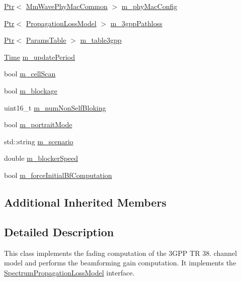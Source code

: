 \begin{DoxyCompactItemize}
\item 
\hyperlink{classns3_1_1Ptr}{Ptr}$<$ \hyperlink{classns3_1_1MmWavePhyMacCommon}{Mm\+Wave\+Phy\+Mac\+Common} $>$ \hyperlink{classns3_1_1MmWave3gppChannel_a50988766af948ea236ce24718a6dca7d}{m\+\_\+phy\+Mac\+Config}
\item 
\hyperlink{classns3_1_1Ptr}{Ptr}$<$ \hyperlink{classns3_1_1PropagationLossModel}{Propagation\+Loss\+Model} $>$ \hyperlink{classns3_1_1MmWave3gppChannel_add8860051acacb1819be2f7321dbd726}{m\+\_\+3gpp\+Pathloss}
\item 
\hyperlink{classns3_1_1Ptr}{Ptr}$<$ \hyperlink{structns3_1_1ParamsTable}{Params\+Table} $>$ \hyperlink{classns3_1_1MmWave3gppChannel_a463c1cc6d34730bbdebdd593f374914b}{m\+\_\+table3gpp}
\item 
\hyperlink{classns3_1_1Time}{Time} \hyperlink{classns3_1_1MmWave3gppChannel_a2844f8c7e7373cb777384eaf0e8a7b11}{m\+\_\+update\+Period}
\item 
bool \hyperlink{classns3_1_1MmWave3gppChannel_ac973f52321b6843ce42f036620af63e8}{m\+\_\+cell\+Scan}
\item 
bool \hyperlink{classns3_1_1MmWave3gppChannel_a5f19d0ed379e7db9448f4f668e0c7927}{m\+\_\+blockage}
\item 
uint16\+\_\+t \hyperlink{classns3_1_1MmWave3gppChannel_addfe5e6c9d8e2531fe165ff86461d2d3}{m\+\_\+num\+Non\+Self\+Bloking}
\item 
bool \hyperlink{classns3_1_1MmWave3gppChannel_a013ed012d87114993312ccfd172fe377}{m\+\_\+portrait\+Mode}
\item 
std\+::string \hyperlink{classns3_1_1MmWave3gppChannel_ae1f263fbc87682905d563221343e4447}{m\+\_\+scenario}
\item 
double \hyperlink{classns3_1_1MmWave3gppChannel_a5d7b7b759283cdf9a6781571e9eeca25}{m\+\_\+blocker\+Speed}
\item 
bool \hyperlink{classns3_1_1MmWave3gppChannel_a2d5a32e24f0d795c5ed210f8c38f4e9b}{m\+\_\+force\+Initial\+Bf\+Computation}
\end{DoxyCompactItemize}
\subsection*{Additional Inherited Members}


\subsection{Detailed Description}
This class implements the fading computation of the 3\+G\+PP TR 38. channel model and performs the beamforming gain computation. It implements the \hyperlink{classns3_1_1SpectrumPropagationLossModel}{Spectrum\+Propagation\+Loss\+Model} interface. 

